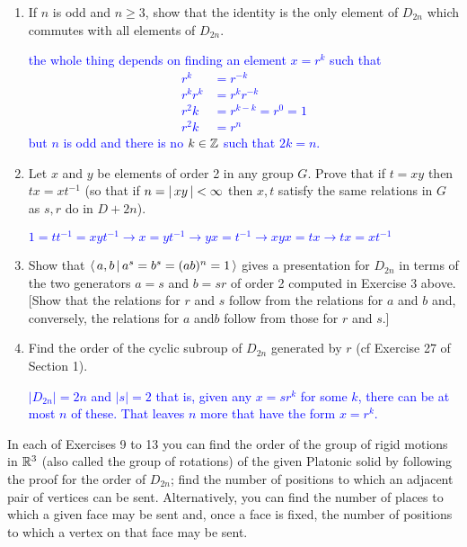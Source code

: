 \documentclass[10pt,a4paper]{report}
\newcommand{\BLUE}[1]{\textcolor{blue}{#1}}
\begin{document}
\begin{enumerate}
\item If $n$ is odd and $n\ge 3$, show that the identity is the only element of $D_{2n}$ which commutes with all elements of $D_{2n}$.

\BLUE{the whole thing depends on finding an element $x=r^k$ such that
\begin{align*}
	r^k&=r^{-k}\\
	r^kr^k&=r^kr^{-k}\\
	r^2k&=r^{k-k}=r^0=1\\
	r^2k&=r^n
\end{align*}but $n$ is odd and there is no $k\in \mathbb{Z}$ such that $2k=n$.
}

\item Let $x$ and $y$ be elements of order 2 in any group $G$.  Prove that if $t=xy$ then $tx=xt^{-1}$ (so that if $n=\left |\, xy \,\right |<\infty$ then $x,t$ satisfy the same relations in $G$ as $s,r$ do in $D+{2n}$).

\BLUE{$1=tt^{-1}=xyt^{-1} \to x=yt^{-1} \to yx=t^{-1} \to xyx=tx \to tx=xt^{-1}$
}

\item Show that $\left \langle\, a,b\,|\,a^s=b^s=(ab)^n=1 \,\right \rangle$ gives a presentation for $D_{2n}$ in terms of the two generators $a=s$ and $b=sr$ of order 2 computed in Exercise  3 above. [Show that the relations for $r$ and $s$ follow from the relations for $a$ and $b$ and, conversely, the relations for $a$ and$b$ follow from those for $r$ and $s$.]

\item Find the order of the cyclic subroup of $D_{2n}$ generated by $r$ (cf Exercise 27 of Section 1).

\BLUE{$|D_{2n}| = 2n$ and $|s|=2$ that is, given any $x=sr^k$ for some $k$, there can be at most $n$ of these.  That leaves $n$ more that have the form $x=r^k$.
}

\end{enumerate}

In each of Exercises 9 to 13 you can find the order of the group of rigid motions in $\mathbb{R}^3$ (also called the group of rotations) of the given Platonic solid by following the proof for the order of $D_{2n}$; find the number of positions to which an adjacent pair of vertices can be sent.  Alternatively, you can find the number of places to which a given face may be sent and, once a face is fixed, the number of positions to which a vertex on that face may be sent.
\end{document}
